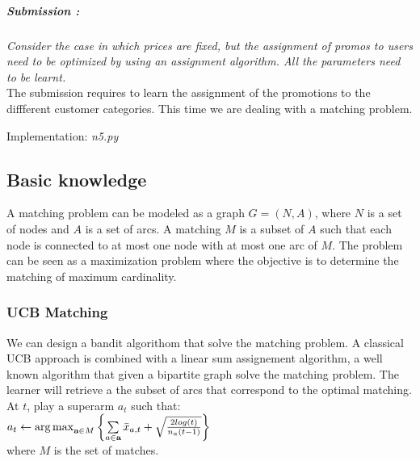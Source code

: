 \subparagraph*{Submission : }
\textit{Consider the case in which prices are fixed, but the assignment of promos to users need to be optimized by using an assignment algorithm. All the parameters need to be learnt.}\\

The submission requires to learn the assignment of the promotions to the diffferent customer categories. This time we are dealing with a matching problem. 

Implementation: \textit{n5.py}
\subsection*{Basic knowledge}
A matching problem can be modeled as a graph $G=(N,A)$, where $N$ is a set of nodes and $A$ is a set of arcs. A matching $M$ is a subset of $A$ such that each node is connected to at most one node with at most one arc of $M$. The problem can be seen as a maximization problem where the objective is to determine the matching of maximum cardinality.\\

\subsubsection*{UCB Matching}
We can design a bandit algorithom that solve the matching problem. A classical UCB approach is combined with a linear sum assignement algorithm, a well known algorithm that given a bipartite graph solve the matching problem. The learner will retrieve a the subset of arcs that correspond to the optimal matching. 
At $t$, play a superarm $a_{t}$ such that:\\
$a_{t} \leftarrow \operatorname{arg\,max}\limits_{\textbf{a} \in M}{\left\{\sum\limits_{a \in \textbf{a}}\bar{x}_{a,t} + \sqrt{\frac{2 log(t)}{{n_{a}(t-1)}} }\right\}}$ \\
where $M$ is the set of matches.

